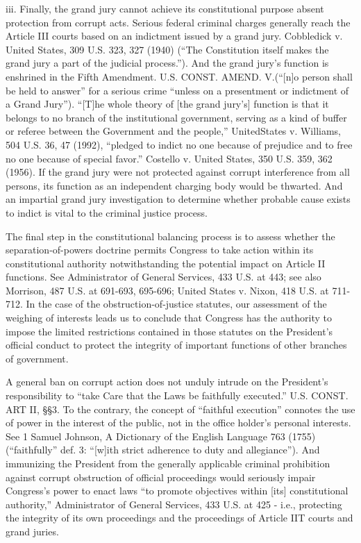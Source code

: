 iii. Finally, the grand jury cannot achieve its constitutional purpose absent protection from corrupt acts.
Serious federal criminal charges generally reach the Article III courts based on an indictment issued by a grand jury.
Cobbledick v. United States, 309 U.S. 323, 327 (1940) (“The Constitution itself makes the grand jury a part of the judicial process.”).
And the grand jury’s function is enshrined in the Fifth Amendment. U.S. CONST. AMEND. V.(“[n]o person shall be held to answer” for a serious crime “unless on a presentment or indictment of a Grand Jury”).
“[T]he whole theory of [the grand jury’s] function is that it belongs to no branch of the institutional government, serving as a kind of buffer or referee between the Government and the people,” UnitedStates v. Williams, 504 U.S. 36, 47 (1992), “pledged to indict no one because of prejudice and to free no one because of special favor.” Costello v. United States, 350 U.S. 359, 362 (1956).
If the grand jury were not protected against corrupt interference from all persons, its function as an independent charging body would be thwarted.
And an impartial grand jury investigation to determine whether probable cause exists to indict is vital to the criminal justice process.

\hr

The final step in the constitutional balancing process is to assess whether the separation-of-powers doctrine permits Congress to take action within its constitutional authority notwithstanding the potential impact on Article II functions.
See Administrator of General Services, 433 U.S. at 443; see also Morrison, 487 U.S. at 691-693, 695-696; United States v. Nixon, 418 U.S. at 711-712.
In the case of the obstruction-of-justice statutes, our assessment of the weighing of interests leads us to conclude that Congress has the authority to impose the limited restrictions contained in those statutes on the President’s official conduct to protect the integrity of important functions of other branches of government.

A general ban on corrupt action does not unduly intrude on the President’s responsibility to “take Care that the Laws be faithfully executed.”
U.S. CONST. ART II, \S\S 3.%
To the contrary, the concept of “faithful execution” connotes the use of power in the interest of the public, not in the office holder’s personal interests.
See 1 Samuel Johnson, A Dictionary of the English Language 763 (1755) (“faithfully” def. 3: “[w]ith strict adherence to duty and allegiance”).
And immunizing the President from the generally applicable criminal prohibition against corrupt obstruction of official proceedings would seriously impair Congress’s power to enact laws “to promote objectives within [its] constitutional authority,” Administrator of General Services, 433 U.S. at 425 - i.e., protecting the integrity of its own proceedings and the proceedings of Article IIT courts and grand juries.


